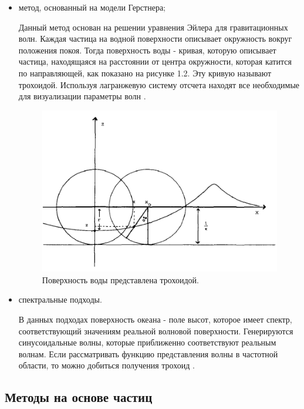 \begin{itemize}
    \item метод, основанный на модели Герстнера;
    
Данный метод основан на решении уравнения Эйлера для гравитационных волн. Каждая частица на водной поверхности описывает окружность вокруг положения покоя. Тогда поверхность воды - кривая, которую описывает частица, находящаяся на расстоянии от центра окружности, которая катится по направляющей, как показано на рисунке 1.2. Эту кривую называют трохоидой. Используя лагранжевую систему отсчета находят все необходимые для визуализации параметры волн \cite{orbit-procedure}.

\begin{figure}[H]
	\begin{center}
		\includegraphics[scale=0.3]{img/trochoid.png}
	\end{center}
	\captionsetup{justification=centering}
	\caption{Поверхность воды представлена трохоидой.}
	\label{img:trochoid}
\end{figure}

    \item спектральные подходы. 

В данных подходах поверхность океана - поле высот, которое имеет спектр, соответствующий значениям реальной волновой поверхности. Генерируются синусоидальные волны, которые приближенно соответствуют реальным волнам. Если рассматривать функцию представления волны в частотной области, то можно добиться получения трохоид \cite{spectrum-darles}\cite{spectrum-tessendorf}.
\end{itemize}

\subsection{Методы на основе частиц}

